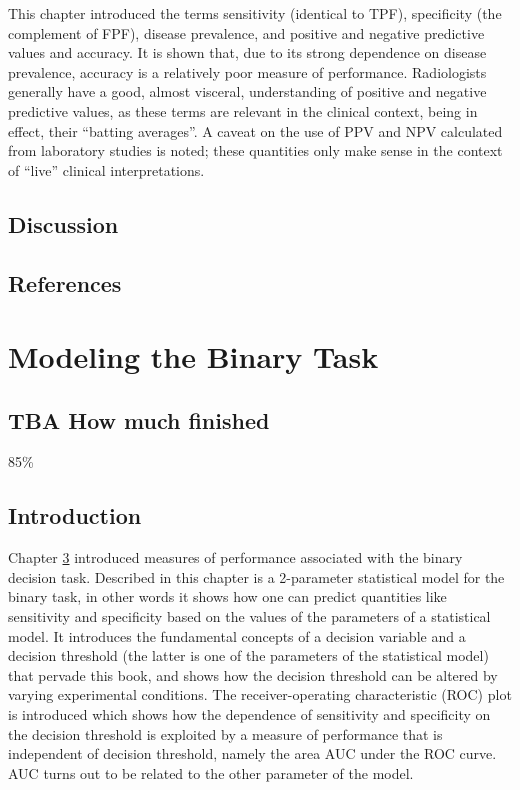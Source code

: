 \documentclass[
]{book}
\begin{document}
This chapter introduced the terms sensitivity (identical to TPF), specificity (the complement of FPF), disease prevalence, and positive and negative predictive values and accuracy. It is shown that, due to its strong dependence on disease prevalence, accuracy is a relatively poor measure of performance. Radiologists generally have a good, almost visceral, understanding of positive and negative predictive values, as these terms are relevant in the clinical context, being in effect, their ``batting averages''. A caveat on the use of PPV and NPV calculated from laboratory studies is noted; these quantities only make sense in the context of ``live'' clinical interpretations.

\hypertarget{binary-task-Discussion}{%
\section{Discussion}\label{binary-task-Discussion}}

\hypertarget{binary-task-references}{%
\section{References}\label{binary-task-references}}

\hypertarget{binary-task-model}{%
\chapter{Modeling the Binary Task}\label{binary-task-model}}

\hypertarget{binary-task-model-how-much-finished}{%
\section{TBA How much finished}\label{binary-task-model-how-much-finished}}

85\%

\hypertarget{binary-task-model-intro}{%
\section{Introduction}\label{binary-task-model-intro}}

Chapter \ref{binary-task-model} introduced measures of performance associated with the binary decision task. Described in this chapter is a 2-parameter statistical model for the binary task, in other words it shows how one can predict quantities like sensitivity and specificity based on the values of the parameters of a statistical model. It introduces the fundamental concepts of a decision variable and a decision threshold (the latter is one of the parameters of the statistical model) that pervade this book, and shows how the decision threshold can be altered by varying experimental conditions. The receiver-operating characteristic (ROC) plot is introduced which shows how the dependence of sensitivity and specificity on the decision threshold is exploited by a measure of performance that is independent of decision threshold, namely the area AUC under the ROC curve. AUC turns out to be related to the other parameter of the model.
\end{document}
